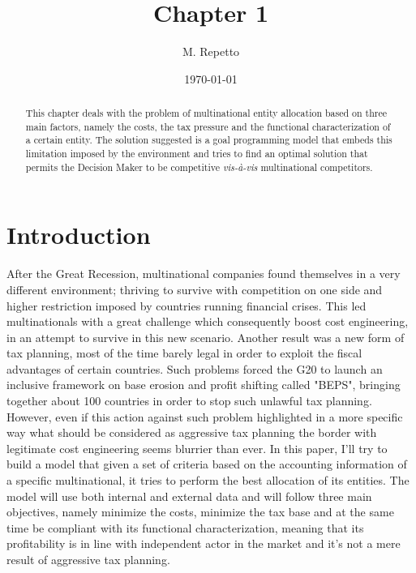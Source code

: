 \documentclass{article}
\begin{document}
\title{Chapter 1}

\author{M. Repetto}

\date{\today}

\maketitle

\begin{abstract}
This chapter deals with the problem of multinational entity allocation based on three main factors, namely the costs, the
tax pressure and the functional characterization of a certain entity. The solution suggested is a goal programming model that embeds this limitation imposed by the environment and tries to find an optimal solution that permits the Decision Maker to be competitive \textit{vis-à-vis} multinational competitors.
\end{abstract}

\section{Introduction}
After the Great Recession, multinational companies found themselves in a very different environment; thriving to survive with competition on one side and higher restriction imposed by countries running financial crises. This led multinationals with a great challenge which consequently boost cost engineering, in an attempt to survive in this new scenario. Another result was a new form of tax planning, most of the time barely legal in order to exploit the fiscal advantages of certain countries\cite{_after_tax_hedging_report.pdf_????}. Such problems forced the G20 to launch an inclusive framework on base erosion and profit shifting called "BEPS", bringing together about 100 countries in order to stop such unlawful tax planning. However, even if this action against such problem highlighted in a more specific way what should be considered as aggressive tax planning the border with legitimate cost engineering seems blurrier than ever\cite{feller_three_2017}.
In this paper, I'll try to build a model that given a set of criteria based on the accounting information of a specific multinational, it tries to perform the best allocation of its entities. The model will use both internal and external data and will follow three main objectives, namely minimize the costs, minimize the tax base and at the same time be compliant with its functional characterization, meaning that its profitability is in line with independent actor in the market \cite{_model_2015} and it's not a mere result of aggressive tax planning.
\end{document}
